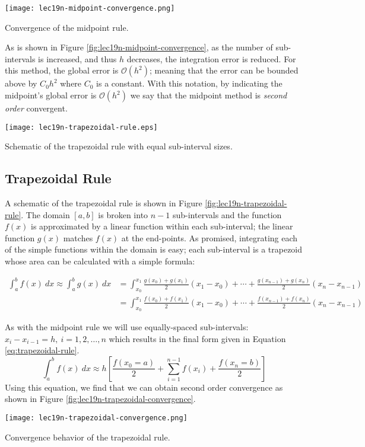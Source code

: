  \begin{marginfigure}
 \texttt{[image: lec19n-midpoint-convergence.png]}
 \caption{Convergence of the midpoint rule.}
 \label{fig:lec19n-midpoint-convergence}
 \end{marginfigure}
 As is shown in Figure \ref{fig:lec19n-midpoint-convergence}, as the number of sub-intervals is increased, and thus $h$ decreases, the integration error is reduced.  For this method, the global error is $\mathcal{O}(h^2)$; meaning that the error can be bounded above by $C_0h^2$ where $C_0$ is a constant.  With this notation, by indicating the midpoint's global error is $\mathcal{O}(h^2)$ we say that the midpoint method is \emph{second order} convergent.
 
 \begin{marginfigure}
 \texttt{[image: lec19n-trapezoidal-rule.eps]}
 \caption{Schematic of the trapezoidal rule with equal sub-interval sizes.}
 \label{fig:lec19n-trapezoidal-rule}
 \end{marginfigure}
 \subsection{Trapezoidal Rule}
 A schematic of the trapezoidal rule is shown in Figure \ref{fig:lec19n-trapezoidal-rule}.  The domain $[a,b]$ is broken into $n-1$ sub-intervals and the function $f(x)$ is approximated by a linear function within each sub-interval; the linear function $g(x)$ matches $f(x)$ at the end-points. As promised, integrating each of the simple functions within the domain is easy; each sub-interval is a trapezoid whose area can be calculated with a simple formula:
 \begin{fullwidth}
 \begin{align*}
 \int_{a}^{b} f(x) \ dx \approx \int_{a}^{b} g(x) \ dx &= \int_{x_0}^{x_1} \frac{g(x_0)+g(x_1)}{2}(x_1 - x_0) + \cdots + \frac{g(x_{n-1})+ g(x_{n})}{2}(x_n - x_{n-1}) \\
 &= \int_{x_0}^{x_1} \frac{f(x_0)+f(x_1)}{2}(x_1 - x_0) + \cdots + \frac{f(x_{n-1})+ f(x_{n})}{2}(x_n - x_{n-1})
 \end{align*} 
 \end{fullwidth}
 
 As with the midpoint rule we will use equally-spaced sub-intervals: $x_{i}-x_{i-1}=h, \ i=1,2,\dots,n$ which results in the final form given in Equation \ref{eq:trapezoidal-rule}.
 \begin{equation}
 \int_{a}^{b} f(x) \ dx \approx h\left[\frac{f(x_0 = a)}{2} + \sum\limits_{i=1}^{n-1} f(x_i)+\frac{f(x_n = b)}{2} \right]
 \label{eq:trapezoidal-rule}
 \end{equation}
 Using this equation, we find that we can obtain second order convergence as shown in Figure \ref{fig:lec19n-trapezoidal-convergence}.
 \begin{marginfigure}
 \texttt{[image: lec19n-trapezoidal-convergence.png]}
 \caption{Convergence behavior of the trapezoidal rule.}
 \label{fig:lec19n-trapezoidal-convergence}
 \end{marginfigure}


